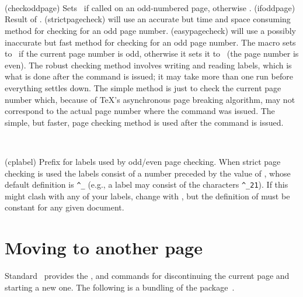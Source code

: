 \begin{syntax}
\cmd{\checkoddpage} \\
 \\
\cmd{\strictpagecheck} \cmd{\easypagecheck} \\
\end{syntax}
\glossary(checkoddpage)%
  {}%
  {Sets  \ptrue\ if called on an odd-numbered page, otherwise
   \pfalse.}
\glossary(ifoddpage)%
  {}%
  {Result of .}
\glossary(strictpagecheck)%
  {}%
  { will use an accurate but time and space consuming method
   for checking for an  odd page number.}
\glossary(easypagecheck)%
  {}%
  { will use a possibly inaccurate but fast method
   for checking for an  odd page number.}
The macro \cmd{\checkoddpage} sets  to \ptrue\ if the current
page number 
is odd, otherwise it sets it to \pfalse\ (the page number is even). The robust
checking method involves writing and reading labels, which is what is done
after the command \cmd{\strictpagecheck} is issued; it may take more than 
one run before everything settles down. The simple method 
is just
to check the current page number which, because of TeX's asynchronous page
breaking algorithm, may not correspond to the actual page number where the
\cmd{\checkoddpage} command was issued. The simple, but faster, page checking
method is used after the \cmd{\easypagecheck} command is issued.

\begin{syntax}
\cmd{\cplabel} \\
\end{syntax}
\glossary(cplabel)%
  {}%
  {Prefix for labels used by  odd/even page checking.}
When strict page checking is used the labels consist of a number preceded
by the value of \cmd{\cplabel}, whose default definition is \verb?^_? (e.g.,
a label may consist of the characters \verb?^_21?). If this
might clash with any of your labels, change \cmd{\cplabel} with 
\cmd{\renewcommand}, but
the definition of \cmd{\cplabel} must be constant for any given document.

\section{Moving to another page} \label{sec:moving}

   Standard \ltx\ provides the \cmd{\newpage}, \cmd{\clearpage}
and \cmd{\cleardoublepage} commands for discontinuing the current 
page and starting a new one. The following is a bundling of the
 package~\cite{NEXTPAGE}.

